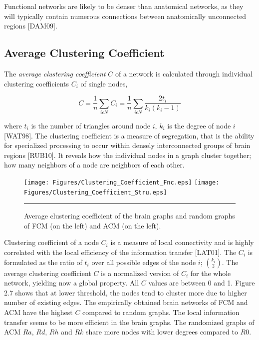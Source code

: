 Functional networks are likely to be denser than anatomical networks, as they will typically contain numerous connections between anatomically unconnected regions [DAM09]. 

\subsection{Average Clustering Coefficient}
    
The \textit{average clustering coefficient} $C$ of a network is calculated through individual clustering coefficients $C_i$ of single nodes,

\begin{equation}
C = \frac{1}{n} \sum\limits_{i\epsilon N}C_i = \frac{1}{n}\sum\limits_{i\epsilon N} \frac{2t_i}{k_i(k_i -1)}
\end{equation} 

where $t_i$ is the number of triangles around node $i$, $k_i$ is the degree of node $i$ [WAT98]. The clustering coefficient is a measure of segregation, that is the ability for specialized processing to occur within densely interconnected groups of brain regions [RUB10]. It reveals how the individual nodes in a graph cluster together; how many neighbors of a node are neighbors of each other. 

\begin{figure}[htbp]
  \centering
	\texttt{[image: Figures/Clustering\_Coefficient\_Fnc.eps]}
	\texttt{[image: Figures/Clustering\_Coefficient\_Stru.eps]} 
    \rule{35em}{0.5pt}
    \caption[Clustering Coefficient]{Average clustering coefficient of the brain graphs and random graphs of FCM (on the left) and ACM (on the left). }
  \label{fig:Clustering Coefficient}
\end{figure}

Clustering coefficient of a node $C_i$ is a measure of local connectivity and is highly correlated with the local efficiency of the information transfer [LAT01]. The $C_i$ is formulated as the ratio of $t_i$ over all possible edges of the node $i$; ${k_i \choose 2} $. The average clustering coefficient $C$ is a normalized version of $C_i$ for the whole network, yielding now a global property. All $C$ values are between 0 and 1. Figure 2.7 shows that at lower threshold, the nodes tend to cluster more due to higher number of existing edges. The empirically obtained brain networks of FCM and ACM have the highest $C$ compared to random graphs. The local information transfer seems to be more efficient in the brain graphs.  The randomized graphs of ACM $Ra$, $Rd$, $Rh$ and $Rk$ share more nodes with lower degrees compared to $R0$.

